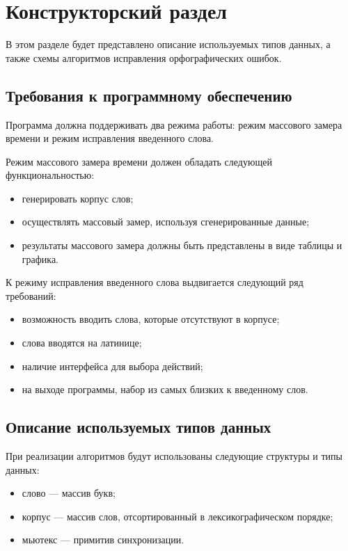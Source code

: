 \chapter{Конструкторский раздел}

В этом разделе будет представлено описание используемых типов данных, а также схемы алгоритмов исправления орфографических ошибок.

\section{Требования к программному обеспечению}

Программа должна поддерживать два режима работы: режим массового замера времени и режим исправления введенного слова.

Режим массового замера времени должен обладать следующей функциональностью:
\begin{itemize}
	\item генерировать корпус слов;
	\item осуществлять массовый замер, используя сгенерированные данные;
	\item результаты массового замера должны быть представлены в виде таблицы и графика.
\end{itemize}

К режиму исправления введенного слова выдвигается следующий ряд требований:
\begin{itemize}
	\item возможность вводить слова, которые отсутствуют в корпусе;
	\item слова вводятся на латинице;
	\item наличие интерфейса для выбора действий;
	\item на выходе программы, набор из самых близких к введенному слов.
\end{itemize}

\section{Описание используемых типов данных}

При реализации алгоритмов будут использованы следующие структуры
и типы данных:
\begin{itemize}
	\item слово --- массив букв;
	\item корпус --- массив слов, отсортированный в лексикографическом порядке;
	\item мьютекс --- примитив синхронизации.
\end{itemize}


